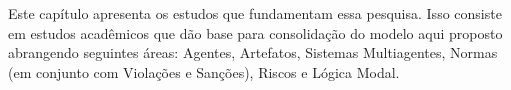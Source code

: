 Este capítulo apresenta os estudos que fundamentam essa pesquisa. Isso consiste em estudos acadêmicos que dão base para consolidação do modelo aqui proposto abrangendo seguintes áreas: Agentes, Artefatos, Sistemas Multiagentes, Normas (em conjunto com Violações e Sanções), Riscos e Lógica Modal. 